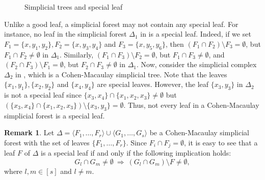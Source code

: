 \documentclass[12pt,a4paper,reqno]{amsart}
\theoremstyle{definition}
\newtheorem{remark}[proposition]{Remark}
\def\D{\Delta}
\def\l{\langle}
\def\r{\rangle}
\begin{document}
\begin{figure}[h!]
        \caption{Simplicial trees and special leaf}
        \label{Figure 1}
    \end{figure}
    Unlike a good leaf, a simplicial forest may not contain any special leaf. For instance, no leaf in the simplicial forest $\D_1$ in  is a special leaf. Indeed, if we set $F_1=\{x,y_1,y_2\}, F_2=\{x,y_3,y_4\}$ and $F_3=\{x,y_5,y_6\}$, then $(F_1\cap F_2)\setminus F_3=\emptyset$, but $F_1\cap F_2\neq\emptyset$ in $\D_1$. Similarly, $(F_1\cap F_3)\setminus F_2=\emptyset$, but $F_1\cap F_3\neq\emptyset$, and $(F_2\cap F_3)\setminus F_1=\emptyset$, but $F_2\cap F_3\neq\emptyset$ in $\D_1$. Now, consider the simplicial complex $\D_2$ in , which is a Cohen-Macaulay simplicial tree. Note that the leaves $\{x_1,y_1\}, \{x_2,y_2\}$ and $\{x_4,y_4\}$ are special leaves. However, the leaf $\{x_3,y_3\}$ in $\Delta_2$ is not a special leaf since $\{x_3,x_4\}\cap \{x_1,x_2,x_3\}\neq \emptyset$ but $(\{x_3,x_4\}\cap \{x_1,x_2,x_3\})\setminus\{x_3,y_3\}=\emptyset$. Thus, not every leaf in a Cohen-Macaulay simplicial forest is a special leaf.
    \begin{remark}\label{CM special leaf remark}
        Let $\Delta=\l F_1,\ldots,F_r\r\cup\l G_1,\ldots,G_s\r$ be a Cohen-Macaulay simplicial forest with the set of leaves $\{F_1,\ldots,F_r\}$. Since $F_i\cap F_j=\emptyset$, it is easy to see that a leaf $F$ of $\Delta$ is a special leaf if and only if the following implication holds:
        \[
G_l\cap G_m\neq\emptyset \ \Rightarrow \ (G_l\cap G_m)\setminus F\neq \emptyset,
        \]
    where $l,m\in[s]$ and $l\neq m$.
    \end{remark}
\end{document}
